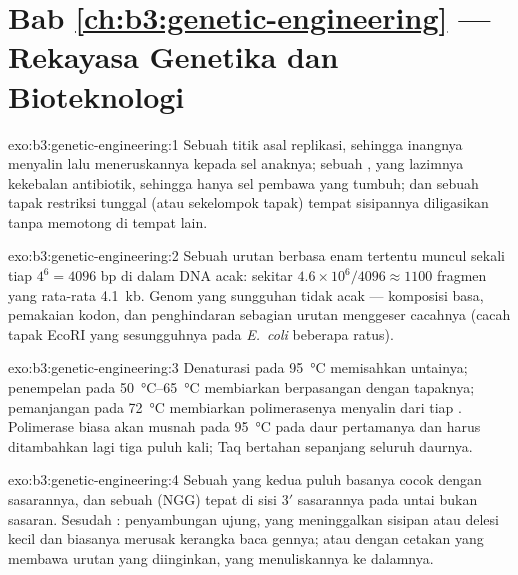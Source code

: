 \section*{Bab \ref{ch:b3:genetic-engineering} --- Rekayasa Genetika dan Bioteknologi}

\begin{solution}{exo:b3:genetic-engineering:1}
Sebuah titik asal replikasi, sehingga inangnya menyalin  lalu
meneruskannya kepada sel anaknya; sebuah , yang lazimnya
kekebalan antibiotik, sehingga hanya sel pembawa  yang tumbuh; dan
sebuah tapak restriksi tunggal (atau sekelompok tapak) tempat sisipannya
diligasikan tanpa memotong  di tempat lain.
\end{solution}

\begin{solution}{exo:b3:genetic-engineering:2}
Sebuah urutan berbasa enam tertentu muncul sekali tiap $4^{6} = 4096$ bp di
dalam DNA acak: sekitar $4.6\times 10^{6}/4096 \approx 1100$ fragmen yang
rata-rata \qty{4.1}{kb}. Genom yang sungguhan tidak acak --- komposisi basa,
pemakaian kodon, dan penghindaran sebagian urutan menggeser cacahnya (cacah
tapak EcoRI yang sesungguhnya pada \emph{E.~coli} beberapa ratus).
\end{solution}

\begin{solution}{exo:b3:genetic-engineering:3}
Denaturasi pada \qty{95}{\celsius} memisahkan untainya; penempelan pada
\qtyrange{50}{65}{\celsius} membiarkan  berpasangan dengan tapaknya;
pemanjangan pada \qty{72}{\celsius} membiarkan polimerasenya menyalin dari tiap
. Polimerase biasa akan musnah pada \qty{95}{\celsius}
pada daur pertamanya dan harus ditambahkan lagi tiga puluh kali; Taq
bertahan sepanjang seluruh daurnya.
\end{solution}

\begin{solution}{exo:b3:genetic-engineering:4}
Sebuah  yang kedua puluh basanya cocok dengan sasarannya, dan
sebuah  (NGG) tepat di sisi 3$'$ sasarannya pada untai bukan sasaran.
Sesudah : penyambungan ujung, yang meninggalkan sisipan
atau delesi kecil dan biasanya merusak kerangka baca gennya; atau  dengan cetakan yang membawa urutan yang diinginkan, yang menuliskannya
ke dalamnya.
\end{solution}

